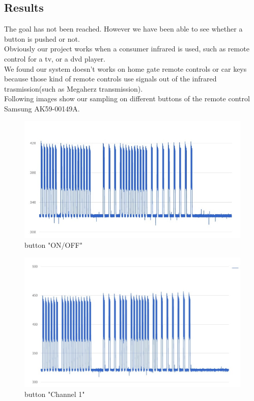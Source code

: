 \subsection{Results}

The goal has not been reached. However we have been able to see whether a button is pushed or not.\\
Obviously our project works when a consumer infrared is used, such as remote control for a tv, or a dvd player.\\
We found our system doesn't works on home gate remote controls or car keys because those kind of remote controls use signals out of the infrared trasmission(such as Megaherz transmission).\\
Following images show our sampling on different buttons of the remote control Samsung AK59-00149A.\\ 

\begin{figure}[h]
	\centering
	\includegraphics[scale=0.5]{graphs/onButton_2.jpg}%
	\caption{button "ON/OFF"}

\end{figure}

\begin{figure}[h]
	\centering
	\includegraphics[scale=0.5]{graphs/1Button.jpg}%
	\caption{button "Channel 1"}
		
\end{figure}

